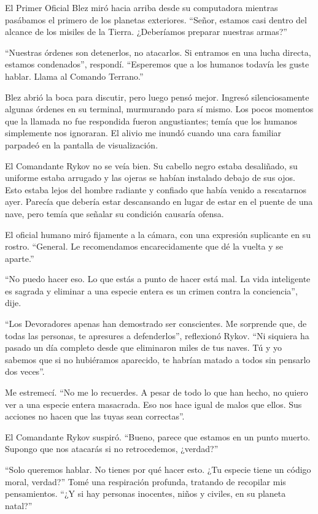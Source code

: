 \documentclass[spanish,12pt,a4paper,oneside,titlepage]{book}
\begin{document}
    El Primer Oficial Blez miró hacia arriba desde su computadora mientras pasábamos el primero de los planetas exteriores. “Señor, estamos casi dentro del alcance de los misiles de la Tierra. ¿Deberíamos preparar nuestras armas?”

    “Nuestras órdenes son detenerlos, no atacarlos. Si entramos en una lucha directa, estamos condenados”, respondí. “Esperemos que a los humanos todavía les guste hablar. Llama al Comando Terrano.”

    Blez abrió la boca para discutir, pero luego pensó mejor. Ingresó silenciosamente algunas órdenes en su terminal, murmurando para sí mismo. Los pocos momentos que la llamada no fue respondida fueron angustiantes; temía que los humanos simplemente nos ignoraran. El alivio me inundó cuando una cara familiar parpadeó en la pantalla de visualización.

    El Comandante Rykov no se veía bien. Su cabello negro estaba desaliñado, su uniforme estaba arrugado y las ojeras se habían instalado debajo de sus ojos. Esto estaba lejos del hombre radiante y confiado que había venido a rescatarnos ayer. Parecía que debería estar descansando en lugar de estar en el puente de una nave, pero temía que señalar su condición causaría ofensa.

    El oficial humano miró fijamente a la cámara, con una expresión suplicante en su rostro. “General. Le recomendamos encarecidamente que dé la vuelta y se aparte.”

    “No puedo hacer eso. Lo que estás a punto de hacer está mal. La vida inteligente es sagrada y eliminar a una especie entera es un crimen contra la conciencia”, dije.

    “Los Devoradores apenas han demostrado ser conscientes. Me sorprende que, de todas las personas, te apresures a defenderlos”, reflexionó Rykov. “Ni siquiera ha pasado un día completo desde que eliminaron miles de tus naves. Tú y yo sabemos que si no hubiéramos aparecido, te habrían matado a todos sin pensarlo dos veces”.

    Me estremecí. “No me lo recuerdes. A pesar de todo lo que han hecho, no quiero ver a una especie entera masacrada. Eso nos hace igual de malos que ellos. Sus acciones no hacen que las tuyas sean correctas”.

    El Comandante Rykov suspiró. “Bueno, parece que estamos en un punto muerto. Supongo que nos atacarás si no retrocedemos, ¿verdad?”

    “Solo queremos hablar. No tienes por qué hacer esto. ¿Tu especie tiene un código moral, verdad?” Tomé una respiración profunda, tratando de recopilar mis pensamientos. “¿Y si hay personas inocentes, niños y civiles, en su planeta natal?”
\end{document}
